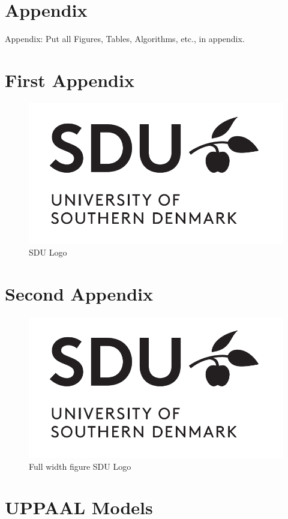 \section*{Appendix}
\appendix
Appendix: Put all Figures, Tables, Algorithms, etc., in appendix.

\section{First Appendix}
\label{app:FirstAppendix}

\begin{figure}[tbh]
\includegraphics[width=.45\textwidth]{Images/sdu-logo.png}
\caption{SDU Logo}
\label{app:fig:SDULogo}
\end{figure}

\section{Second Appendix}
\label{app:SecondAppendix}

\begin{figure}[tbh]
\includegraphics[width=.95\textwidth]{Images/sdu-logo.png}
\caption{Full width figure SDU Logo}
\label{app:fig:SDULogoV2}
\end{figure}

\section{UPPAAL Models}
\label{app:UPPAALModels}

